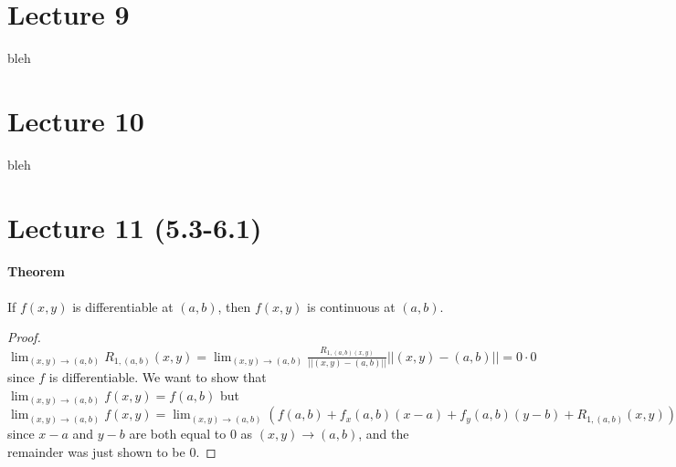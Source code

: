 \documentclass[tikz,10pt,letter]{article}
\theoremstyle{plain}
\theoremstyle{definition}
\begin{document}
\section*{Lecture 9}
bleh

\section*{Lecture 10}
bleh




\section*{Lecture 11 (5.3-6.1)}
\paragraph{Theorem}
If $f(x,y)$ is differentiable at $(a,b)$, then $f(x,y)$ is continuous at $(a,b)$. 
\begin{proof}
     $\lim_{(x,y)\rightarrow(a,b)}R_{1,(a,b)}(x,y)=\lim_{(x,y)\rightarrow(a,b)}\frac{R_{1,(a,b)(x,y)}}{||(x,y)-(a,b)||}||(x,y)-(a,b)||=0\cdot0$ since $f$ is differentiable. We want to show that $\lim_{(x,y)\rightarrow(a,b)}f(x,y)=f(a,b)$ but $\lim_{(x,y)\rightarrow(a,b)}f(x,y)=\lim_{(x,y)\rightarrow(a,b)}\left(f(a,b)+f_x(a,b)(x-a)+f_y(a,b)(y-b)+R_{1,(a,b)}(x,y)\right)=f(a,b)+0+0+0$ since $x-a$ and $y-b$ are both equal to $0$ as $(x,y)\rightarrow(a,b)$, and the remainder was just shown to be $0$. 
\end{proof}
\end{document}
